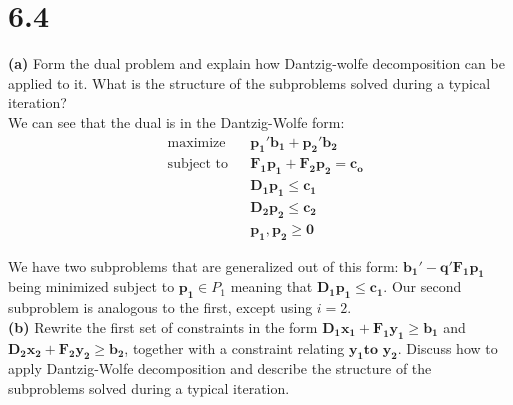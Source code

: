 \documentclass{article}
\begin{document}
\section*{6.4}

\noindent
\textbf{(a)}
Form the dual problem and explain how Dantzig-wolfe decomposition can be applied to it.  What is the structure of the subproblems solved during a typical iteration? \\

\noindent
We can see that the dual is in the Dantzig-Wolfe form:
\begin{equation*}
\begin{aligned}
& \text{maximize} && \mathbf{p_1' b_1 + p_2' b_2} \\
& \text{subject to} &&  \mathbf{F_1 p_1 + F_2 p_2 = c_o} \\
& & & \mathbf{D_1 p_1 \leq c_1} \\
& & & \mathbf{D_2 p_2 \leq c_2} \\
& & & \mathbf{p_1, p_2 \geq 0}
\end{aligned}
\end{equation*}

\noindent
We have two subproblems that are generalized out of this form: $\mathbf{b_1' - q'F_1 p_1}$ being minimized subject to $\mathbf{p_1} \in P_1$ meaning that $\mathbf{D_1 p_1 \leq c_1}$.  Our second subproblem is analogous to the first, except using $i = 2$. \\

\noindent
\textbf{(b)} Rewrite the first set of constraints in the form $\mathbf{D_1 x_1 + F_1 y_1 \geq b_1}$ and $\mathbf{D_2 x_2 + F_2 y_2 \geq b_2}$, together with a constraint relating $\mathbf{y_1 \text{to } y_2}$.  Discuss how to apply Dantzig-Wolfe decomposition and describe the structure of the subproblems solved during a typical iteration. \\
\end{document}
